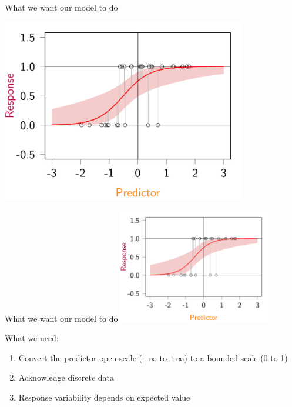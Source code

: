 \documentclass{beamer}\usepackage[]{graphicx}\usepackage[]{color}
\newenvironment{knitrout}{}{} %
\begin{document}
\begin{frame}{What we want our model to do}
\centering



\begin{knitrout}\small
{}\color{fgcolor}
\includegraphics[width=0.8\textwidth,height=0.6\textwidth]{figure/logreg1-1} 

\end{knitrout}

\end{frame}

\begin{frame}{What we want our model to do}
\centering
\includegraphics[width=0.5\textwidth]{figure/logreg1-1.pdf}

\begin{block}{What we need:}
  \begin{enumerate}[<+->]
    \item Convert the predictor open scale ($-\infty$ to $+\infty$) to a bounded scale (0 to 1)
    \item Acknowledge discrete data
    \item Response variability depends on expected value
  \end{enumerate}
\end{block}
\end{frame}
\end{document}
